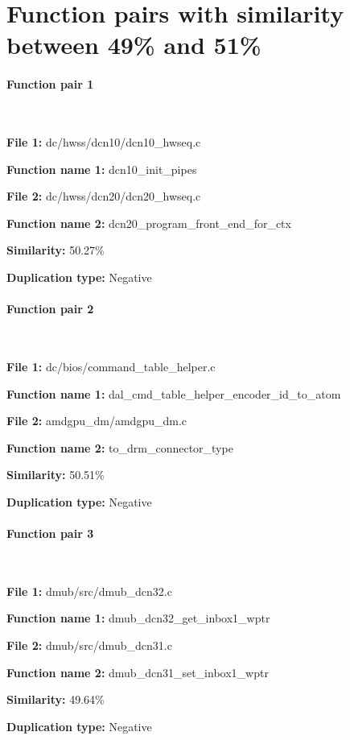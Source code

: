 \section{Function pairs with similarity between 49\% and 51\%}

\paragraph{Function pair 1 }  

\

\textbf{File 1:} dc/hwss/dcn10/dcn10\_hwseq.c

\textbf{Function name 1:} dcn10\_init\_pipes

\textbf{File 2:} dc/hwss/dcn20/dcn20\_hwseq.c

\textbf{Function name 2:} dcn20\_program\_front\_end\_for\_ctx

\textbf{Similarity:} 50.27\%

\textbf{Duplication type:} Negative


\paragraph{Function pair 2 }  

\

\textbf{File 1:} dc/bios/command\_table\_helper.c

\textbf{Function name 1:} dal\_cmd\_table\_helper\_encoder\_id\_to\_atom

\textbf{File 2:} amdgpu\_dm/amdgpu\_dm.c

\textbf{Function name 2:} to\_drm\_connector\_type

\textbf{Similarity:} 50.51\%

\textbf{Duplication type:} Negative


\paragraph{Function pair 3 }  

\

\textbf{File 1:} dmub/src/dmub\_dcn32.c

\textbf{Function name 1:} dmub\_dcn32\_get\_inbox1\_wptr

\textbf{File 2:} dmub/src/dmub\_dcn31.c

\textbf{Function name 2:} dmub\_dcn31\_set\_inbox1\_wptr

\textbf{Similarity:} 49.64\%

\textbf{Duplication type:} Negative


